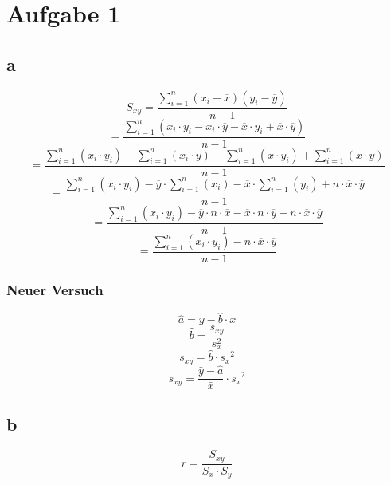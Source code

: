 
\section{Aufgabe 1}
\subsection{a}
\[ S_{xy} 
= \frac{\sum_{i=1}^{n}(x_i - \overline{x})(y_i - \overline{y})}{n - 1} \]
\[ = \frac{\sum_{i=1}^{n}(x_i \cdot y_i - x_i \cdot \overline{y} - 
\overline{x} \cdot y_i + \overline{x} \cdot \overline{y})}{n - 1} \]
\[ = \frac{\sum_{i=1}^{n}(x_i \cdot y_i)
 - \sum_{i=1}^{n}(x_i \cdot \overline{y})
 - \sum_{i=1}^{n}(\overline{x} \cdot y_i) 
 + \sum_{i=1}^{n}(\overline{x} \cdot \overline{y})}{n-1} \]
\[ = \frac{\sum_{i=1}^{n}(x_i \cdot y_i)
 - \overline{y} \cdot \sum_{i=1}^{n}(x_i)
 - \overline{x} \cdot \sum_{i=1}^{n}(y_i) 
 + n \cdot \overline{x} \cdot \overline{y}}{n-1} \]
\[ = \frac{\sum_{i=1}^{n}(x_i \cdot y_i)
 - \overline{y} \cdot n \cdot \overline{x}
 - \overline{x} \cdot n \cdot \overline{y} 
 + n \cdot \overline{x} \cdot \overline{y}}{n-1} \]
\[ = \frac{\sum_{i=1}^{n}(x_i \cdot y_i)
 - n \cdot \overline{x} \cdot \overline{y}}{n-1} \]
 
\subsubsection*{Neuer Versuch}
\[ \hat{a} = \bar{y} - \hat{b} \cdot \bar{x} \]
\[ \hat{b} = \frac{s_{xy}}{s_x^2} \]
\[ s_{xy} = \hat{b} \cdot {s_x}^2 \]
\[ s_{xy} = \frac{\bar{y} - \hat{a}}{\bar{x}} \cdot {s_x}^2 \]
\[  \]
\[  \]

\subsection{b}
\[ r = \frac{S_{xy}}{S_x \cdot S_y} \]
